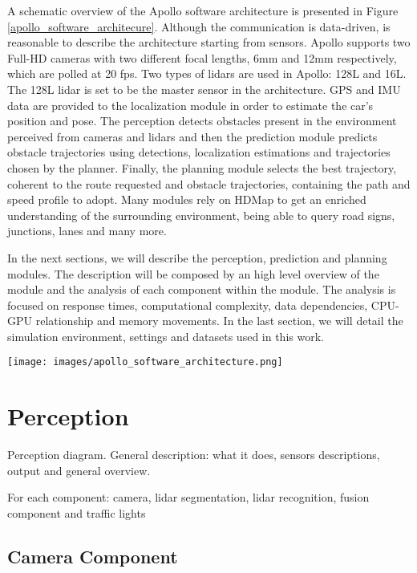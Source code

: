 \documentclass[conference]{IEEEtran}
\begin{document}
A schematic overview of the Apollo software architecture is presented in Figure \ref{apollo_software_architecure}.
Although the communication is data-driven, is reasonable to describe the architecture starting from sensors.
Apollo supports two Full-HD cameras with two different focal lengths, 6mm and 12mm respectively, which are polled at 20 fps.
Two types of lidars are used in Apollo: 128L and 16L. The 128L lidar is set to be the master sensor in the architecture.
GPS and IMU data are provided to the localization module in order to estimate the car's position and pose.
The perception detects obstacles present in the environment perceived from cameras and lidars and then the prediction module predicts obstacle trajectories using detections, localization estimations and trajectories chosen by the planner.
Finally, the planning module selects the best trajectory, coherent to the route requested and obstacle trajectories, containing the path and speed profile to adopt.
Many modules rely on HDMap to get an enriched understanding of the surrounding environment, being able to query road signs, junctions, lanes and many more. 

In the next sections, we will describe the perception, prediction and planning modules.
The description will be composed by an high level overview of the module and the analysis of each component within the module.
The analysis is focused on response times, computational complexity, data dependencies, CPU-GPU relationship and memory movements.
In the last section, we will detail the simulation environment, settings and datasets used in this work.
\begin{figure*}[t]
    \centering
    \texttt{[image: images/apollo\_software\_architecture.png]}
    \caption{Apollo Software Architecture}
    \label{apollo_software_architecure}
\end{figure*}

\section{Perception}
Perception diagram.
General description: what it does, sensors descriptions, output and general overview.

For each component: camera, lidar segmentation, lidar recognition, fusion component and traffic lights

\subsection{Camera Component}
\end{document}

